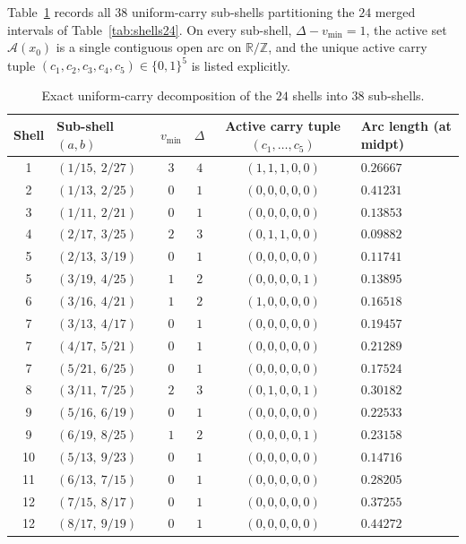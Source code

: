 \documentclass[11pt,reqno]{amsart}
\theoremstyle{definition}
\theoremstyle{remark}
\newcommand{\ZZ}{\mathbb{Z}}
\newcommand{\RR}{\mathbb{R}}
\begin{document}
Table~\ref{tab:subshells38} records all $38$ uniform-carry sub-shells partitioning the $24$ merged intervals of Table~\ref{tab:shells24}. On every sub-shell, $\Delta - v_{\min} = 1$, the active set $\mathcal{A}(x_0)$ is a single contiguous open arc on $\RR/\ZZ$, and the unique active carry tuple $(c_1, c_2, c_3, c_4, c_5) \in \{0,1\}^5$ is listed explicitly.

\begin{table}[ht]
\centering
\caption{Exact uniform-carry decomposition of the $24$ shells into $38$ sub-shells.}
\label{tab:subshells38}
\footnotesize
\renewcommand{\arraystretch}{1.04}
\setlength{\tabcolsep}{6pt}
\begin{tabular}{@{}clcccl@{}}
\toprule
Shell & Sub-shell $(a, b)$ & $v_{\min}$ & $\Delta$ & Active carry tuple $(c_1,\dots,c_5)$ & Arc length (at midpt) \\
\midrule
 1 & $(1/15,\ 2/27)$ & $3$ & $4$ & $(1,1,1,0,0)$ & $0.26667$ \\
 2 & $(1/13,\ 2/25)$ & $0$ & $1$ & $(0,0,0,0,0)$ & $0.41231$ \\
 3 & $(1/11,\ 2/21)$ & $0$ & $1$ & $(0,0,0,0,0)$ & $0.13853$ \\
 4 & $(2/17,\ 3/25)$ & $2$ & $3$ & $(0,1,1,0,0)$ & $0.09882$ \\
 5 & $(2/13,\ 3/19)$ & $0$ & $1$ & $(0,0,0,0,0)$ & $0.11741$ \\
 5 & $(3/19,\ 4/25)$ & $1$ & $2$ & $(0,0,0,0,1)$ & $0.13895$ \\
 6 & $(3/16,\ 4/21)$ & $1$ & $2$ & $(1,0,0,0,0)$ & $0.16518$ \\
 7 & $(3/13,\ 4/17)$ & $0$ & $1$ & $(0,0,0,0,0)$ & $0.19457$ \\
 7 & $(4/17,\ 5/21)$ & $0$ & $1$ & $(0,0,0,0,0)$ & $0.21289$ \\
 7 & $(5/21,\ 6/25)$ & $0$ & $1$ & $(0,0,0,0,0)$ & $0.17524$ \\
 8 & $(3/11,\ 7/25)$ & $2$ & $3$ & $(0,1,0,0,1)$ & $0.30182$ \\
 9 & $(5/16,\ 6/19)$ & $0$ & $1$ & $(0,0,0,0,0)$ & $0.22533$ \\
 9 & $(6/19,\ 8/25)$ & $1$ & $2$ & $(0,0,0,0,1)$ & $0.23158$ \\
10 & $(5/13,\ 9/23)$ & $0$ & $1$ & $(0,0,0,0,0)$ & $0.14716$ \\
11 & $(6/13,\ 7/15)$ & $0$ & $1$ & $(0,0,0,0,0)$ & $0.28205$ \\
12 & $(7/15,\ 8/17)$ & $0$ & $1$ & $(0,0,0,0,0)$ & $0.37255$ \\
12 & $(8/17,\ 9/19)$ & $0$ & $1$ & $(0,0,0,0,0)$ & $0.44272$ \\

\end{tabular}
\end{table}
\end{document}
